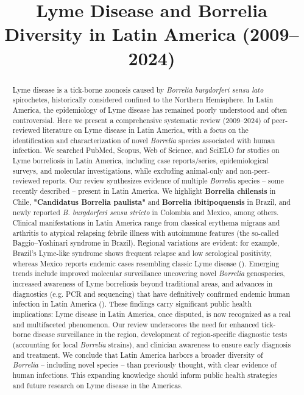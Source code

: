 \documentclass[11pt,letterpaper]{article}
\title{\setstretch{1.2}Lyme Disease and Borrelia Diversity in Latin America (2009–2024)}
\author{}
\date{}
\begin{document}
\maketitle

\begin{abstract}
Lyme disease is a tick-borne zoonosis caused by \textit{Borrelia burgdorferi sensu lato} spirochetes, historically considered confined to the Northern Hemisphere. In Latin America, the epidemiology of Lyme disease has remained poorly understood and often controversial. Here we present a comprehensive systematic review (2009–2024) of peer-reviewed literature on Lyme disease in Latin America, with a focus on the identification and characterization of novel \textit{Borrelia} species associated with human infection. We searched PubMed, Scopus, Web of Science, and SciELO for studies on Lyme borreliosis in Latin America, including case reports/series, epidemiological surveys, and molecular investigations, while excluding animal-only and non-peer-reviewed reports. Our review synthesizes evidence of multiple \textit{Borrelia} species – some recently described – present in Latin America. We highlight \textbf{Borrelia chilensis} in Chile, \textbf{"Candidatus Borrelia paulista"} and \textbf{Borrelia ibitipoquensis} in Brazil, and newly reported \textit{B. burgdorferi sensu stricto} in Colombia and Mexico, among others. Clinical manifestations in Latin America range from classical erythema migrans and arthritis to atypical relapsing febrile illness with autoimmune features (the so-called Baggio–Yoshinari syndrome in Brazil). Regional variations are evident: for example, Brazil's Lyme-like syndrome shows frequent relapse and low serological positivity, whereas Mexico reports endemic cases resembling classic Lyme disease (\citealt{Colunga-Salas2020}). Emerging trends include improved molecular surveillance uncovering novel \textit{Borrelia} genospecies, increased awareness of Lyme borreliosis beyond traditional areas, and advances in diagnostics (e.g. PCR and sequencing) that have definitively confirmed endemic human infection in Latin America (\citealt{Colunga-Salas2020}). These findings carry significant public health implications: Lyme disease in Latin America, once disputed, is now recognized as a real and multifaceted phenomenon. Our review underscores the need for enhanced tick-borne disease surveillance in the region, development of region-specific diagnostic tests (accounting for local \textit{Borrelia} strains), and clinician awareness to ensure early diagnosis and treatment. We conclude that Latin America harbors a broader diversity of \textit{Borrelia} – including novel species – than previously thought, with clear evidence of human infections. This expanding knowledge should inform public health strategies and future research on Lyme disease in the Americas.
\end{abstract}
\end{document}
